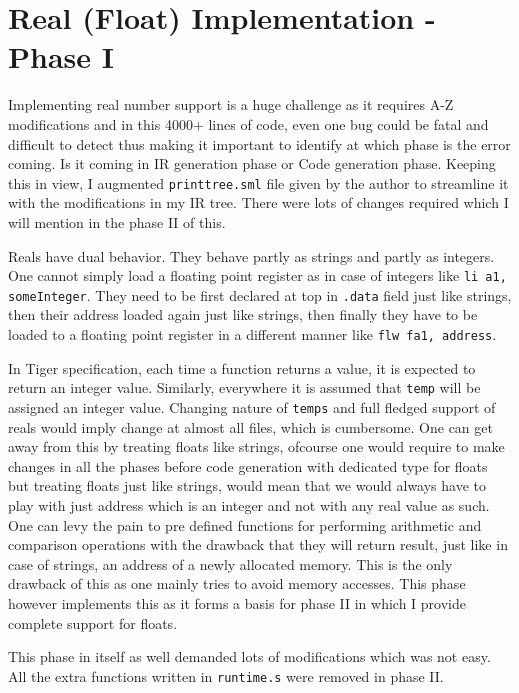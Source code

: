 \section{Real (Float) Implementation - Phase I}

Implementing real number support is a huge challenge as it requires A-Z modifications and in this 4000+ lines of code, even one bug could be fatal and difficult to detect thus making it important to identify at which phase is the error coming. Is it coming in IR generation phase or Code generation phase. Keeping this in view, I augmented \texttt{printtree.sml} file given by the author to streamline it with the modifications in my IR tree. There were lots of changes required which I will mention in the phase II of this.

Reals have dual behavior. They behave partly as strings and partly as integers. One cannot simply load a floating point register as in case of integers like \texttt{li a1, someInteger}. They need to be first declared at top in \texttt{.data} field just like strings, then their address loaded again just like strings, then finally they have to be loaded to a floating point register in a different manner like \texttt{flw fa1, address}.

In Tiger specification, each time a function returns a value, it is expected to return an integer value. Similarly, everywhere it is assumed that \texttt{temp} will be assigned an integer value. Changing nature of \texttt{temps} and full fledged support of reals would imply change at almost all files, which is cumbersome. One can get away from this by treating floats like strings, ofcourse one would require to make changes in all the phases before code generation with dedicated type for floats but treating floats just like strings, would mean that we would always have to play with just address which is an integer and not with any real value as such. One can levy the pain to pre defined functions for performing arithmetic and comparison operations with the drawback that they will return result, just like in case of strings, an address of a newly allocated memory. This is the only drawback of this as one mainly tries to avoid memory accesses. This phase however implements this as it forms a basis for phase II in which I provide complete support for floats.

This phase in itself as well demanded lots of modifications which was not easy. All the extra functions written in \texttt{runtime.s} were removed in phase II.

